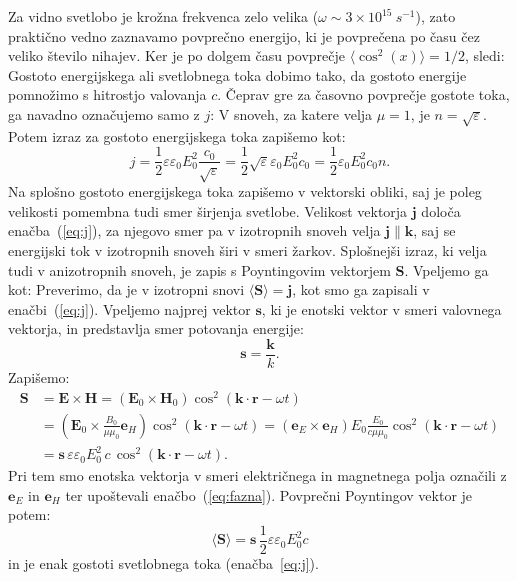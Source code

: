 Za vidno svetlobo je krožna frekvenca zelo velika 
($\omega \sim 3 \times 10^{15}~\si{s}^{-1}$), zato praktično vedno 
zaznavamo povprečno energijo, ki je povprečena po času čez veliko 
število nihajev. Ker je po dolgem času povprečje $\langle\cos^2(x)\rangle= 1/2$, sledi:
Gostoto energijskega ali svetlobnega toka dobimo tako, da gostoto energije
pomnožimo s hitrostjo valovanja $c$. Čeprav gre za časovno povprečje gostote
toka, ga navadno označujemo samo z $j$:
V snoveh, za katere velja $\mu = 1$, je $n = \sqrt{\varepsilon}$. Potem izraz za gostoto
energijskega toka zapišemo kot:
\begin{equation}
j = \frac{1}{2}\varepsilon \varepsilon_0 E_0^2 \frac{c_0}{\sqrt{\varepsilon}} = 
\frac{1}{2}\sqrt{\varepsilon} \varepsilon_0 E_0^2 c_0 = \frac{1}{2} \varepsilon_0 E_0^2 c_0 n.
\label{eq:03_33}
\end{equation}
Na splošno gostoto energijskega toka zapišemo v vektorski obliki, saj je poleg velikosti
pomembna tudi smer širjenja svetlobe. Velikost vektorja $\mathbf{j}$ določa 
enačba~(\ref{eq:j}), za njegovo smer pa v izotropnih snoveh velja $\mathbf{j}\parallel \mathbf{k}$,
saj se energijski tok v izotropnih snoveh širi v smeri žarkov. 
Splošnejši izraz, ki velja tudi v anizotropnih snoveh, je
zapis s Poyntingovim vektorjem $\mathbf{S}$. Vpeljemo ga kot:
Preverimo, da je v izotropni snovi $\langle\mathbf{S}\rangle = \mathbf{j}$, kot smo ga zapisali 
v enačbi~(\ref{eq:j}). Vpeljemo najprej vektor $\mathbf{s}$, ki je enotski vektor
v smeri valovnega vektorja, in predstavlja smer potovanja energije:
\begin{equation}
\mathbf{s} = \frac{\mathbf{k}}{k}.
\label{eq:03_34}
\end{equation}
Zapišemo:
\begin{align}
\mathbf{S}&=\mathbf{E}\times \mathbf{H} = \left( \mathbf{E}_0\times \mathbf{H}_0 \right)
\cos^2 \left(\mathbf{k}\cdot \mathbf{r} - \omega t\right) \\
& =  \left( \mathbf{E}_0 \times \frac{B_0}{\mu\mu_0}\mathbf{e}_H \right) 
\cos^2 \left(\mathbf{k}\cdot \mathbf{r} - \omega t\right) = 
\left(\mathbf{e}_E \times \mathbf{e}_H \right)E_0\frac{E_0}{c\mu\mu_0} 
\cos^2 \left(\mathbf{k}\cdot \mathbf{r} - \omega t\right)\\
&= \mathbf{s}\, \varepsilon \varepsilon_0 E_0^2\,c\, \cos^2 \left(\mathbf{k}\cdot \mathbf{r} - \omega t\right)\!.
\label{eq:03_35}
\end{align}
Pri tem smo enotska vektorja v smeri električnega in magnetnega polja označili z 
$\mathbf{e}_E$ in $\mathbf{e}_H$ ter upoštevali enačbo~(\ref{eq:fazna}). 
Povprečni Poyntingov vektor je potem:
\begin{equation}
\langle\mathbf{S}\rangle =  
\mathbf{s}\, \frac{1}{2}\varepsilon \varepsilon_0 E_0^2 c
\label{eq:03_36}
\end{equation}
in je enak gostoti svetlobnega toka (enačba~\ref{eq:j}).

